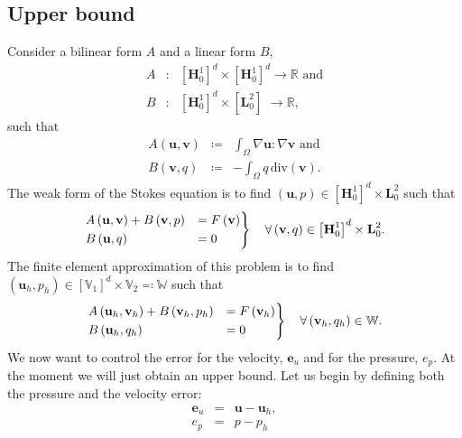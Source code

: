 \documentclass{article}
\begin{document}
\subsection{Upper bound}
Consider a bilinear form $A$ and a linear form $B$,
\begin{eqnarray}
A&:&\left[\textbf{H}^1_0\right]^d\times\left[\textbf{H}^1_0\right]^d \rightarrow\mathbb{R}\text{ and}\\
B&:&\left[\textbf{H}^1_0\right]^d\times \left[\textbf{L}^2_0\right]\,\,\rightarrow\mathbb{R},
\end{eqnarray}
such that
\begin{eqnarray}
A\left(\textbf{u},\textbf{v}\right)&\coloneqq& \int_{\Omega}\nabla\textbf{u}:\nabla \textbf{v}\text{ and}\\
B\left(\textbf{v},q\right)&\coloneqq&-\int_{\Omega}q\,\text{div}\left(\textbf{v}\right).
\end{eqnarray}
The weak form of the Stokes equation is to find $\left(\textbf{u},p\right)\in \left[\textbf{H}^1_0\right]^d  \times \textbf{L}^2_0$ such that
\begin{equation}\label{weak_stokes}
\begin{rcases}
A\left(\textbf{u},\textbf{v}\right)+B\left(\textbf{v},p\right)&=F\left(\textbf{v}\right)\\
B\left(\textbf{u},q\right)&=0
\end{rcases}
\quad\forall \left(\textbf{v},q\right)\in \left[\textbf{H}^1_0\right]^d  \times \textbf{L}^2_0.
\end{equation}
The finite element approximation of this problem is to find $\left(\textbf{u}_h,p_h\right)\in \left[\mathbb{V}_1\right]^d  \times \mathbb{V}_2\eqqcolon\mathbb{W}$ such that
\begin{equation}\label{weak_stokes_approx}
\begin{rcases}
A\left(\textbf{u}_h,\textbf{v}_h\right)+B\left(\textbf{v}_h,p_h\right)&=F\left(\textbf{v}_h\right)\\
B\left(\textbf{u}_h,q_h\right)&=0
\end{rcases}
\quad\forall \left(\textbf{v}_h,q_h\right)\in \mathbb{W}.
\end{equation}
We now want to control the error for the velocity, $\textbf{e}_u$ and for the pressure, $e_p$.   At the moment we will just obtain an upper bound.  Let us begin by defining both the pressure and the velocity error:
\begin{eqnarray}\label{error_velocity}
\textbf{e}_u&=&\textbf{u}-\textbf{u}_h,\\\label{error_pressure}
e_p &=& p-p_h
\end{eqnarray}
\end{document}
